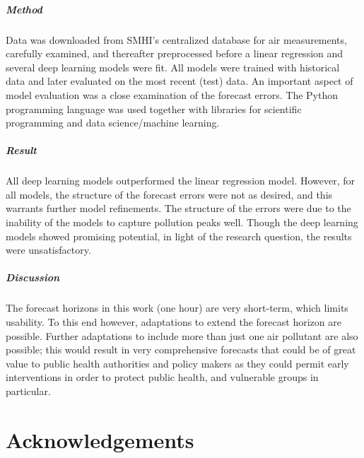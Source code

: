 \documentclass[12pt]{report}
\numberwithin{equation}{section}
\begin{document}
\paragraph{Method}
Data was downloaded from SMHI's centralized database for air measurements, carefully examined, and thereafter preprocessed before a linear regression and several deep learning models were fit. All models were trained with historical data and later evaluated on the most recent (test) data. An important aspect of model evaluation was a close examination of the forecast errors. The Python programming language was used together with libraries for scientific programming and data science/machine learning.

\paragraph{Result}
All deep learning models outperformed the linear regression model. However, for all models, the structure of the forecast errors were not as desired, and this warrants further model refinements. The structure of the errors were due to the inability of the models to capture pollution peaks well. Though the deep learning models showed promising potential, in light of the research question, the results were unsatisfactory. 

\paragraph{Discussion}
The forecast horizons in this work (one hour) are very short-term, which limits usability. To this end however, adaptations to extend the forecast horizon are possible. Further adaptations to include more than just one air pollutant are also possible; this would result in very comprehensive forecasts that could be of great value to public health authorities and policy makers as they could permit early interventions in order to protect public health, and vulnerable groups in particular.

\chapter*{Acknowledgements}
\thispagestyle{empty}

\tableofcontents
\thispagestyle{plain}
\thispagestyle{plain}
\setcounter{page}{1}

\listoffigures
\thispagestyle{plain}
\end{document}
